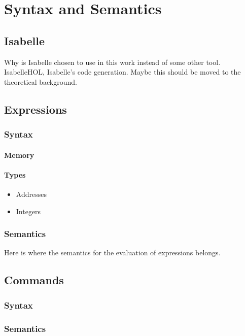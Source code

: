 \chapter{Syntax and Semantics}\label{chapter:semantics}

\section{Isabelle}

Why is Isabelle chosen to use in this work instead of some other tool.
IsabelleHOL, Isabelle's code generation.
Maybe this should be moved to the theoretical background.

\section{Expressions}

\subsection{Syntax}

\subsubsection{Memory}
\subsubsection{Types}

\begin{itemize}
\item Addresses
\item Integers
\end{itemize}

\subsection{Semantics}

Here is where the semantics for the evaluation of expressions belongs.

\section{Commands}

\subsection{Syntax}

\subsection{Semantics}

